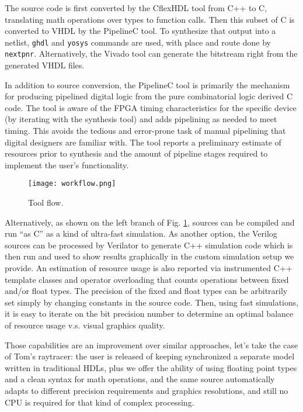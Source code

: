 \documentclass[conference]{IEEEtran}
\begin{document}
The source code is first converted by the CflexHDL tool from C++ to C, translating math operations over types to function calls. Then this subset of C is converted to VHDL by the PipelineC tool. To synthesize that output into a netlist, \texttt{ghdl} and \texttt{yosys} commands are used, with place and route done by \texttt{nextpnr}. Alternatively, the Vivado tool can generate the bitstream right from the generated VHDL files.

In addition to source conversion, the PipelineC tool is primarily the mechanism for producing pipelined digital logic from the pure combinatorial logic derived C code. The tool is aware of the FPGA timing characteristics for the specific device (by iterating with the synthesis tool) and adds pipelining as needed to meet timing. This avoids the tedious and error-prone task of manual pipelining that digital designers are familiar with. The tool reports a preliminary estimate of resources prior to synthesis and the amount of pipeline stages required to implement the user’s functionality.

\begin{figure}
\texttt{[image: workflow.png]}
\caption{Tool flow.}
\label{figflow}
\end{figure}

Alternatively, as shown on the left branch of Fig. \ref{figflow}, sources can be compiled and run “as C” as a kind of ultra-fast simulation. As another option, the Verilog sources can be processed by Verilator to generate C++ simulation code which is then run and used to show results graphically in the custom simulation setup we provide. An estimation of resource usage is also reported via instrumented C++ template classes and operator overloading that counts operations between fixed and/or float types. The precision of the fixed and float types can be arbitrarily set simply by changing constants in the source code. Then, using fast simulations, it is easy to iterate on the bit precision number to determine an optimal balance of resource usage v.s. visual graphics quality.

Those capabilities are an improvement over similar approaches, let's take the case of Tom's raytracer: the user is released of keeping synchronized a separate model written in traditional HDLs, plus we offer the ability of using floating point types and a clean syntax for math operations, and the same source automatically adapts to different precision requirements and graphics resolutions, and still no CPU is required for that kind of complex processing.
\\
\end{document}
